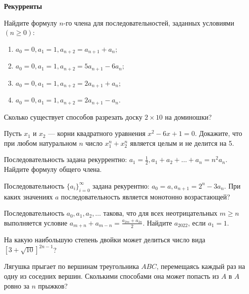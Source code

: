 \documentclass{article}
\begin{document}
    \large

    \begin{center}
        \textbf{Рекурренты}
    \end{center}

    \begin{enumerate_boxed}

        \item Найдите формулу $n$-го члена для последовательностей, заданных условиями $( n  \geqslant 0)$:
        \begin{enumerate}
            \item $a_0 = 0, a_1 = 1, a_{n + 2} = a_{n + 1} + a_n;$
            \item $a_0 = 0, a_1 = 1, a_{n + 2} = 5a_{n + 1} - 6a_n;$
            \item $a_0 = 0, a_1 = 1, a_{n + 2} = 2a_{n + 1} + a_n;$
            \item $a_0 = 0, a_1 = 1, a_{n + 2} = 2a_{n + 1} - a_n.$
        \end{enumerate}

        \item Сколько существует способов разрезать доску $2 \times 10$ на доминошки?

        \item Пусть $ x_1 $ и $ x_2 $ — корни квадратного уравнения $ x^2 - 6x + 1 = 0 $.
        Докажите, что при любом натуральном $ n $ число $ x^n_1 + x^n_2 $ является целым и не делится на 5.

        \item Последовательность задана рекуррентно: $ a_1 = \frac{1}{2} , a_1 + a_2 + \dotsc + a_n = n^2 a_n $.
        Найдите формулу общего члена.

        \item Последовательность $ \{a_i\}^{\infty}_{i=0} $ задана рекурентно: $ a_0 = a, a_{n+1} = 2^n - 3a_n $.
        При каких значениях $ a $ последовательность является монотонно возрастающей?

        \item Последовательность $a_0, a_1, a_2, \ldots$ такова, что для всех неотрицательных $m \geq n$ выполняется условие $a_{m+n} + a_{m-n} = \frac{a_{2m} + a_{2n}}{2}$.
        Найдите $a_{2022}$, если $a_1 = 1$.

        \item На какую наибольшую степень двойки может делиться число вида $\left[3 + \sqrt{10}\right]^{2n-1}$?

        \item Лягушка прыгает по вершинам треугольника $ABC$, перемещаясь каждый раз на одну из соседних вершин.
        Сколькими способами она может попасть из $A$ в $A$ ровно за $n$ прыжков?


\end{enumerate_boxed}
\end{document}
